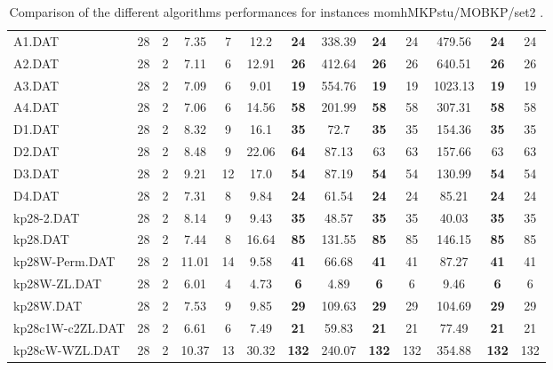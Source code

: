 \begin{table}[h]
{\begin{tabular}{lcccccccccccc}
A1.DAT & 28 & 2 &  \textcolor{blue2}{7.35} & 7 & 12.2 &  \textbf{24} & 338.39 &  \textbf{24} & 24 & 479.56 &  \textbf{24} & 24 \\
A2.DAT & 28 & 2 &  \textcolor{blue2}{7.11} & 6 & 12.91 &  \textbf{26} & 412.64 &  \textbf{26} & 26 & 640.51 &  \textbf{26} & 26 \\
A3.DAT & 28 & 2 &  \textcolor{blue2}{7.09} & 6 & 9.01 &  \textbf{19} & 554.76 &  \textbf{19} & 19 & 1023.13 &  \textbf{19} & 19 \\
A4.DAT & 28 & 2 &  \textcolor{blue2}{7.06} & 6 & 14.56 &  \textbf{58} & 201.99 &  \textbf{58} & 58 & 307.31 &  \textbf{58} & 58 \\
D1.DAT & 28 & 2 &  \textcolor{blue2}{8.32} & 9 & 16.1 &  \textbf{35} & 72.7 &  \textbf{35} & 35 & 154.36 &  \textbf{35} & 35 \\
D2.DAT & 28 & 2 &  \textcolor{blue2}{8.48} & 9 & 22.06 &  \textbf{64} & 87.13 & 63 & 63 & 157.66 & 63 & 63 \\
D3.DAT & 28 & 2 &  \textcolor{blue2}{9.21} & 12 & 17.0 &  \textbf{54} & 87.19 &  \textbf{54} & 54 & 130.99 &  \textbf{54} & 54 \\
D4.DAT & 28 & 2 &  \textcolor{blue2}{7.31} & 8 & 9.84 &  \textbf{24} & 61.54 &  \textbf{24} & 24 & 85.21 &  \textbf{24} & 24 \\
kp28-2.DAT & 28 & 2 &  \textcolor{blue2}{8.14} & 9 & 9.43 &  \textbf{35} & 48.57 &  \textbf{35} & 35 & 40.03 &  \textbf{35} & 35 \\
kp28.DAT & 28 & 2 &  \textcolor{blue2}{7.44} & 8 & 16.64 &  \textbf{85} & 131.55 &  \textbf{85} & 85 & 146.15 &  \textbf{85} & 85 \\
kp28W-Perm.DAT & 28 & 2 & 11.01 & 14 &  \textcolor{blue2}{9.58} &  \textbf{41} & 66.68 &  \textbf{41} & 41 & 87.27 &  \textbf{41} & 41 \\
kp28W-ZL.DAT & 28 & 2 & 6.01 & 4 &  \textcolor{blue2}{4.73} &  \textbf{6} & 4.89 &  \textbf{6} & 6 & 9.46 &  \textbf{6} & 6 \\
kp28W.DAT & 28 & 2 &  \textcolor{blue2}{7.53} & 9 & 9.85 &  \textbf{29} & 109.63 &  \textbf{29} & 29 & 104.69 &  \textbf{29} & 29 \\
kp28c1W-c2ZL.DAT & 28 & 2 &  \textcolor{blue2}{6.61} & 6 & 7.49 &  \textbf{21} & 59.83 &  \textbf{21} & 21 & 77.49 &  \textbf{21} & 21 \\
kp28cW-WZL.DAT & 28 & 2 &  \textcolor{blue2}{10.37} & 13 & 30.32 &  \textbf{132} & 240.07 &  \textbf{132} & 132 & 354.88 &  \textbf{132} & 132 \\
\bottomrule
\end{tabular}
}%
\caption{Comparison of the different algorithms performances for instances momhMKPstu/MOBKP/set2 .}
\label{tab:table_compare_momhMKPstu/MOBKP/set2 }
\end{table}
